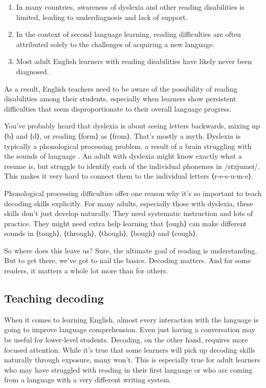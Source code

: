 \begin{enumerate}[noitemsep]
    \item In many countries, awareness of dyslexia and other reading disabilities is limited, leading to underdiagnosis and lack of support.

    \item In the context of second language learning, reading difficulties are often attributed solely to the challenges of acquiring a new language.
    
    \item Most adult English learners with reading disabilities have likely never been diagnosed.
\end{enumerate}

As a result, English teachers need to be aware of the possibility of reading disabilities among their students, especially when learners show persistent difficulties that seem disproportionate to their overall language progress.

\bigskip

You've probably heard that dyslexia is about seeing letters backwards, mixing up ⟨b⟩ and ⟨d⟩, or reading ⟨form⟩ as ⟨from⟩. That's mostly a myth. Dyslexia is typically a phonological processing problem, a result of a brain struggling with the sounds of language \citep{lyon2003definition}. An adult with dyslexia might know exactly what a resume is, but struggle to identify each of the individual phonemes in /rɛzjumeɪ/. This makes it very hard to connect them to the individual letters ⟨r-e-s-u-m-e⟩.

Phonological processing difficulties offer one reason why it's so important to teach decoding skills explicitly. For many adults, especially those with dyslexia, these skills don't just develop naturally. They need systematic instruction and lots of practice. They might need extra help learning that ⟨ough⟩ can make different sounds in ⟨tough⟩, ⟨through⟩, ⟨though⟩, ⟨bough⟩ and ⟨cough⟩.

So where does this leave us? Sure, the ultimate goal of reading is understanding. But to get there, we've got to nail the basics. Decoding matters. And for some readers, it matters a whole lot more than for others.

\subsection{Teaching decoding}

When it comes to learning English, almost every interaction with the language is going to improve language comprehension. Even just having a conversation may be useful for lower-level students. Decoding, on the other hand, requires more focused attention. While it's true that some learners will pick up decoding skills naturally through exposure, many won't. This is especially true for adult learners who may have struggled with reading in their first language or who are coming from a language with a very different writing system.

